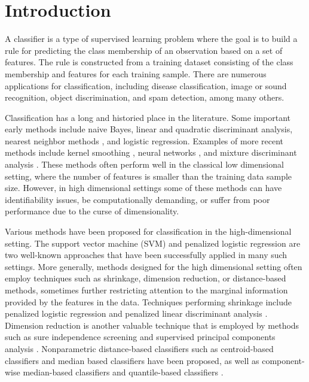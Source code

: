 
\section{Introduction}
\label{sec:intro}

A classifier is a type of supervised learning problem where the goal is to build
a rule for predicting the class membership of an observation based on a set of
features.  The rule is constructed from a training dataset consisting of the
class membership and features for each training sample.  There are numerous
applications for classification, including disease classification, image or
sound recognition, object discrimination, and spam detection, among many others.

Classification has a long and historied place in the literature.  Some important
early methods include naive Bayes, linear and quadratic discriminant analysis,
nearest neighbor methods \cite{cover1967}, and logistic regression.  Examples of
more recent methods include kernel smoothing \cite{mika1999}, neural networks
\cite{ripley1994}, and mixture discriminant analysis \cite{hastie1996}.  These
methods often perform well in the classical low dimensional setting, where the
number of features is smaller than the training data sample size.  However, in
high dimensional settings some of these methods can have identifiability issues,
be computationally demanding, or suffer from poor performance due to the curse
of dimensionality.

Various methods have been proposed for classification in the high-dimensional
setting.  The support vector machine (SVM) \cite{cortes1995} and penalized
logistic regression \cite{park2007} are two well-known approaches that have been
successfully applied in many such settings.  More generally, methods designed
for the high dimensional setting often employ techniques such as shrinkage,
dimension reduction, or distance-based methods, sometimes further restricting
attention to the marginal information provided by the features in the data.
Techniques performing shrinkage include penalized logistic regression and
penalized linear discriminant analysis \cite{tibshirani2002, clemmensen2011,
  witten2011}.  Dimension reduction is another valuable technique that is
employed by methods such as sure independence screening \cite{fan2008} and
supervised principal components analysis \cite{bair2006}.  Nonparametric
distance-based classifiers such as centroid-based classifiers
\cite{tibshirani2002} and median based classifiers \cite{jornsten2004,
  ghosh2005} have been proposed, as well as component-wise median-based
classifiers \cite{hall2012} and quantile-based classifiers \cite{hennig2016}.

